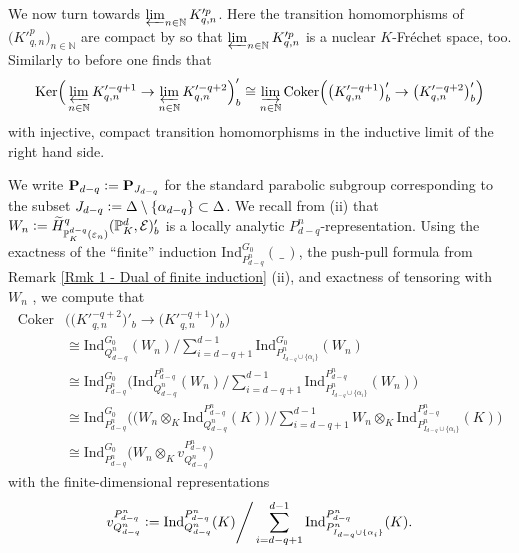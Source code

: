 \documentclass[a4paper, reqno, 10pt]{amsart}
\theoremstyle{definition}
\numberwithin{equation}{section}
\newcommand{\blank}{{\,\_\,}}
\newcommand{\Coker}{{\mathrm{Coker}}}
\newcommand{\defeq}{\vcentcolon=}
\newcommand{\Ind}{{\mathrm{Ind}}}
\newcommand{\Ker}{{\mathrm{Ker}}}
\newcommand{\ra}{\rightarrow}
\newcommand{\BN}{{\mathbb {N}}}
\newcommand{\BP}{{\mathbb {P}}}
\newcommand{\CE}{{\mathcal {E}}}
\newcommand{\bP}{{\mathrm{\bf P}}}
\begin{document}
We now turn towards $ \varprojlim_{n\in \BN} K'^{p}_{q,n}$.
Here the transition homomorphisms of $\big( K'^{p}_{q,n} \big)_{n\in \BN}$ are compact by  so that $\varprojlim_{n\in \BN} K'^{p}_{q,n}$ is a nuclear $K$-Fr\'echet space, too. 
Similarly to before one finds that
\begin{equation*}
	\Ker \Big( \varprojlim_{n\in \BN} K'^{ -q+1}_{q,n} \ra \varprojlim_{n\in \BN} K'^{-q+2}_{q,n} \Big)'_b 
	\cong \varinjlim_{n\in \BN} \Coker\Big( \big(K'^{-q+1}_{q,n}\big)'_b \ra \big(K'^{-q+2}_{q,n}\big)'_b \Big)
\end{equation*}
with injective, compact transition homomorphisms in the inductive limit of the right hand side.


We write $\bP_{d-q} \defeq \bP_{J_{d-q}}$ for the standard parabolic subgroup corresponding to the subset $J_{d-q} \defeq \Delta \setminus \{\alpha_{d-q}\} \subset \Delta$.
We recall from  (ii) that $W_n \defeq \widetilde{H}^{q}_{\BP_K^{d-q}(\varepsilon_n) } (\BP_K^d, \CE)'_b$ is a locally analytic $P^n_{d-q}$-representation.
Using the exactness of the ``finite'' induction $\Ind^{G_0}_{P^n_{d-q}}(\blank)$, the push-pull formula from Remark \ref{Rmk 1 - Dual of finite induction} (ii), and exactness of tensoring with $W_n$ \cite[Lemma 2.1 (ii)]{BreuilHerzig18TowardsFinSlopePartGLn}, we compute that
\begin{align*}
	\Coker&\Big( \big(K'^{-q+2}_{q,n}\big)'_b \ra \big(K'^{-q+1}_{q,n}\big)'_b \Big) \\
	&\cong \Ind^{G_0}_{Q^n_{d-q}} (W_n) \Bigg/ \sum_{i=d-q+1}^{d-1} \Ind^{G_0}_{P^n_{I_{d-q} \cup \{ \alpha_i \} }} (W_n) \\
	&\cong \Ind^{G_0}_{P^n_{d-q}} \Bigg( \Ind^{P^n_{d-q}}_{Q^n_{d-q}} (W_n) \Bigg/ \sum_{i=d-q+1}^{d-1} \Ind^{P^n_{d-q}}_{P^n_{I_{d-q} \cup \{\alpha_i \}}} (W_n) \Bigg) \\
	&\cong \Ind^{G_0}_{P^n_{d-q}} \Bigg( \Big( W_n \otimes_K \Ind^{P^n_{d-q}}_{Q^n_{d-q}} (K) \Big) \Bigg/ \sum_{i=d-q+1}^{d-1} W_n \otimes_K \Ind^{P^n_{d-q}}_{P^n_{I_{d-q} \cup \{\alpha_i \}}} (K) \Bigg) \\
	&\cong \Ind^{G_0}_{P^n_{d-q}} \Big( W_n \otimes_K v^{P^n_{d-q}}_{Q^n_{d-q}} \Big)
\end{align*}
with the finite-dimensional representations
\begin{equation*}
	v^{P^n_{d-q}}_{Q^n_{d-q}} \defeq  \Ind^{P^n_{d-q}}_{Q^n_{d-q}} (K) \Bigg/ \sum_{i= d-q+1}^{d-1} \Ind^{P^n_{d-q}}_{P^n_{I_{d-q} \cup \{\alpha_i \}}} (K) .
\end{equation*}
\end{document}
